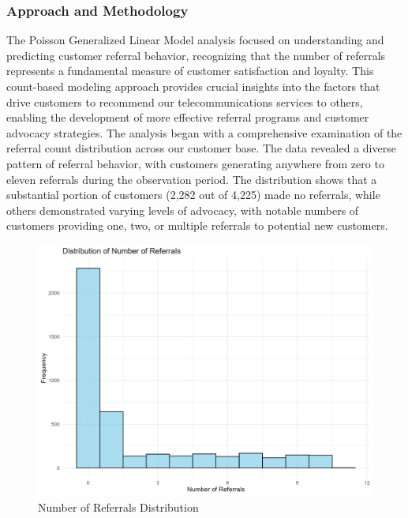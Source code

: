 \documentclass[
]{article}
\begin{document}
\hypertarget{approach-and-methodology-1}{%
\subsubsection{Approach and
Methodology}\label{approach-and-methodology-1}}

The Poisson Generalized Linear Model analysis focused on understanding
and predicting customer referral behavior, recognizing that the number
of referrals represents a fundamental measure of customer satisfaction
and loyalty. This count-based modeling approach provides crucial
insights into the factors that drive customers to recommend our
telecommunications services to others, enabling the development of more
effective referral programs and customer advocacy strategies. The
analysis began with a comprehensive examination of the referral count
distribution across our customer base. The data revealed a diverse
pattern of referral behavior, with customers generating anywhere from
zero to eleven referrals during the observation period. The distribution
shows that a substantial portion of customers (2,282 out of 4,225) made
no referrals, while others demonstrated varying levels of advocacy, with
notable numbers of customers providing one, two, or multiple referrals
to potential new customers.

\begin{figure}

{\centering \includegraphics[width=0.85\linewidth]{Plots/number_referrals_distribution} 

}

\caption{Number of Referrals Distribution}\label{fig:referrals-distribution-plot}
\end{figure}
\end{document}

